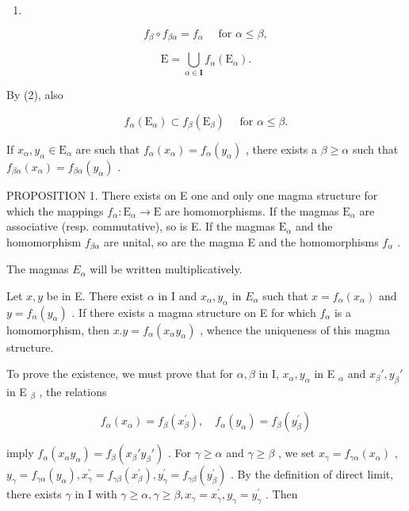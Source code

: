 \begin{enumerate}
\def\labelenumi{(\arabic{enumi})}
\setcounter{enumi}{1}
\tightlist
\item
\end{enumerate}

\[
f _ {\beta} \circ f _ {\beta \alpha} = f _ {\alpha} \quad \text { for } \alpha \leqslant \beta ,\tag{3}
\]

\[
\mathrm{E} = \bigcup_ {\alpha \in \mathbf {I}} f _ {\alpha} (\mathrm{E} _ {\alpha}).
\]

By (2), also

\[
f _ {\alpha} (\mathrm{E} _ {\alpha}) \subset f _ {\beta} (\mathrm{E} _ {\beta}) \quad \text { for } \alpha \leqslant \beta .\tag{4}
\]

If \(x_{\alpha}, y_{\alpha} \in \mathrm{E}_{\alpha}\) are such that \(f_{\alpha}(x_{\alpha}) = f_{\alpha}(y_{\alpha})\) , there exists a \(\beta \geqslant \alpha\) such that \(f_{\beta \alpha}(x_{\alpha}) = f_{\beta \alpha}(y_{\alpha})\) .

PROPOSITION 1. There exists on E one and only one magma structure for which the mappings \(f_{\alpha} \colon \mathrm{E}_{\alpha} \to \mathrm{E}\) are homomorphisms. If the magmas \(\mathrm{E}_{\alpha}\) are associative (resp. commutative), so is E. If the magmas \(\mathrm{E}_{\alpha}\) and the homomorphism \(f_{\beta \alpha}\) are unital, so are the magma E and the homomorphisms \(f_{\alpha}\) .

The magmas \(E_{\alpha}\) will be written multiplicatively.

Let \(x, y\) be in E. There exist \(\alpha\) in I and \(x_{\alpha}, y_{\alpha}\) in \(E_{\alpha}\) such that \(x = f_{\alpha}(x_{\alpha})\) and \(y = f_{\alpha}(y_{\alpha})\) . If there exists a magma structure on E for which \(f_{\alpha}\) is a homomorphism, then \(x.y = f_{\alpha}(x_{\alpha}y_{\alpha})\) , whence the uniqueness of this magma structure.

To prove the existence, we must prove that for \(\alpha, \beta\) in I, \(x_{\alpha}, y_{\alpha}\) in E \(_{\alpha}\) and \(x_{\beta}', y_{\beta}'\) in E \(_{\beta}\) , the relations

\[
f _ {\alpha} (x _ {\alpha}) = f _ {\beta} (x _ {\beta} ^ {\prime}), \quad f _ {\alpha} (y _ {\alpha}) = f _ {\beta} (y _ {\beta} ^ {\prime})\tag{5}
\]

imply \(f_{\alpha}(x_{\alpha}y_{\alpha}) = f_{\beta}(x_{\beta}'y_{\beta}')\) . For \(\gamma \geqslant \alpha\) and \(\gamma \geqslant \beta\) , we set \(x_{\gamma} = f_{\gamma \alpha}(x_{\alpha})\) , \(y_{\gamma} = f_{\gamma \alpha}(y_{\alpha}), x_{\gamma}^{\prime} = f_{\gamma \beta}(x_{\beta}^{\prime}), y_{\gamma}^{\prime} = f_{\gamma \beta}(y_{\beta}^{\prime})\) . By the definition of direct limit, there exists \(\gamma\) in I with \(\gamma \geqslant \alpha, \gamma \geqslant \beta, x_{\gamma} = x_{\gamma}^{\prime}, y_{\gamma} = y_{\gamma}^{\prime}\) . Then

